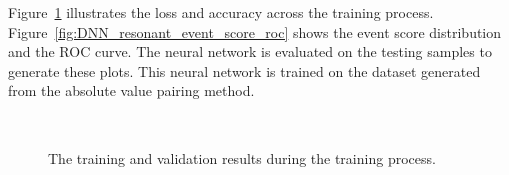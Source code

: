 \documentclass[12pt]{article}
\begin{document}
        Figure~\ref{fig:DNN_resonant_loss_accuracy} illustrates the loss and accuracy across the training process. Figure~\ref{fig:DNN_resonant_event_score_roc} shows the event score distribution and the ROC curve. The neural network is evaluated on the testing samples to generate these plots. This neural network is trained on the dataset generated from the absolute value pairing method.
        \begin{figure}[htpb] 
            \centering
             \\
            \caption{The training and validation results during the training process.}
            \label{fig:DNN_resonant_loss_accuracy}
        \end{figure}
\end{document}
